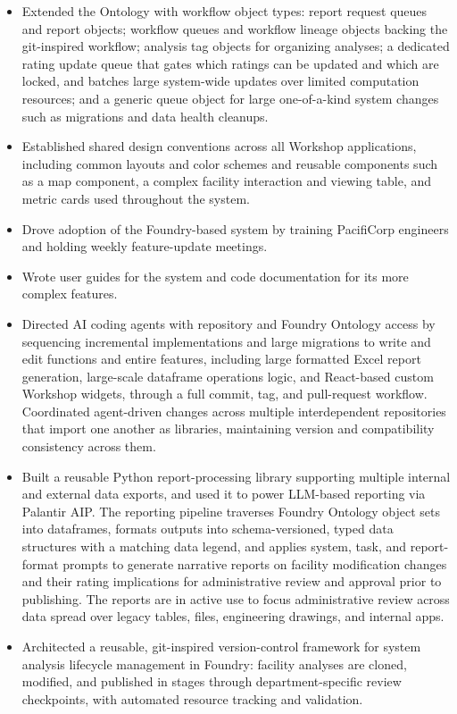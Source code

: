 \documentclass[10pt, letterpaper]{article}
\newenvironment{rlist}{%
  \begin{itemize}[leftmargin=1.4em, itemsep=1pt, topsep=2pt, parsep=0pt]%
}{%
  \end{itemize}%
}
\begin{document}
\begin{rlist}
  \item Extended the Ontology with workflow object types: report request queues and report objects; workflow queues and workflow lineage objects backing the git-inspired workflow; analysis tag objects for organizing analyses; a dedicated rating update queue that gates which ratings can be updated and which are locked, and batches large system-wide updates over limited computation resources; and a generic queue object for large one-of-a-kind system changes such as migrations and data health cleanups.
  \item Established shared design conventions across all Workshop applications, including common layouts and color schemes and reusable components such as a map component, a complex facility interaction and viewing table, and metric cards used throughout the system.
  \item Drove adoption of the Foundry-based system by training PacifiCorp engineers and holding weekly feature-update meetings.
  \item Wrote user guides for the system and code documentation for its more complex features.
  \item Directed AI coding agents with repository and Foundry Ontology access by sequencing incremental implementations and large migrations to write and edit functions and entire features, including large formatted Excel report generation, large-scale dataframe operations logic, and React-based custom Workshop widgets, through a full commit, tag, and pull-request workflow. Coordinated agent-driven changes across multiple interdependent repositories that import one another as libraries, maintaining version and compatibility consistency across them.
  \item Built a reusable Python report-processing library supporting multiple internal and external data exports, and used it to power LLM-based reporting via Palantir AIP. The reporting pipeline traverses Foundry Ontology object sets into dataframes, formats outputs into schema-versioned, typed data structures with a matching data legend, and applies system, task, and report-format prompts to generate narrative reports on facility modification changes and their rating implications for administrative review and approval prior to publishing. The reports are in active use to focus administrative review across data spread over legacy tables, files, engineering drawings, and internal apps.
  \item Architected a reusable, git-inspired version-control framework for system analysis lifecycle management in Foundry: facility analyses are cloned, modified, and published in stages through department-specific review checkpoints, with automated resource tracking and validation.

\end{rlist}
\end{document}
